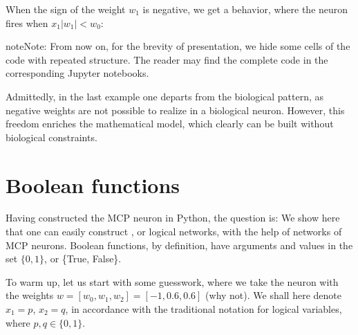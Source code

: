 \documentclass[letterpaper,10pt,english]{jupyterBook}
\begin{document}
\noindent{}

\sphinxAtStartPar
When the sign of the weight \(w_1\) is negative, we get a  behavior, where the neuron fires when \(x_1 |w_1| < w_0\):

\noindent{}

\begin{sphinxadmonition}{note}{Note:}
\sphinxAtStartPar
From now on, for the brevity of presentation, we hide some cells of the code with repeated structure. The reader may find the complete code in the corresponding Jupyter notebooks.
\end{sphinxadmonition}

\sphinxAtStartPar
Admittedly, in the last example one departs from the biological pattern, as negative weights are not possible to realize in a biological neuron. However, this freedom enriches the mathematical model, which clearly can be built without biological constraints.


\section{Boolean functions}
\label{\detokenize{docs/mcp:boolean-functions}}\label{\detokenize{docs/mcp:bool-sec}}
\sphinxAtStartPar
Having constructed the MCP neuron in Python, the question is:  We show here that one can easily construct , or logical networks, with the help of networks of MCP neurons. Boolean functions, by definition, have arguments and values in the set \(\{ 0,1 \}\), or \{True, False\}.

\sphinxAtStartPar
To warm up, let us start with some guesswork, where we take the neuron with the weights \(w=[w_0,w_1,w_2]=[-1,0.6,0.6]\) (why not). We shall here denote \(x_1=p\), \(x_2=q\), in accordance with the traditional notation for logical variables, where \(p,q \in \{0,1\}\).

\begin{sphinxVerbatim}[commandchars=\\\{\}]
 
             

   \PYG{p}{[}\PYG{p}{]}       
       \PYG{p}{[}\PYG{p}{]}   
        \PYG{p}{[}\PYG{p}{]}\PYG{p}{[}\PYG{p}{]} 
\end{sphinxVerbatim}
\end{document}
